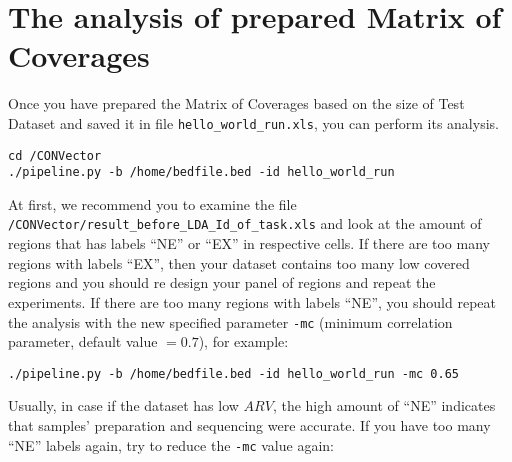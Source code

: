 \documentclass{article}
\begin{document}
\begin{usecase}
\end{usecase}






\newpage

\section{The analysis of prepared Matrix of Coverages}

Once you have prepared the Matrix of Coverages based on the size of Test Dataset and saved it in file \texttt{hello\_world\_run.xls}, you can perform its analysis.

\begin{lstlisting}[style=DOS, caption={Run of the package using prepared Matrix of Coverages}]
cd /CONVector
./pipeline.py -b /home/bedfile.bed -id hello_world_run
\end{lstlisting}

At first, we recommend you to examine the file \texttt{/CONVector/result\_before\_LDA\_Id\_of\_task.xls} and look at the amount of regions that has labels ``NE'' or ``EX'' in respective cells. If there are too many regions with labels ``EX'', then your dataset contains too many low covered regions and you should re design your panel of regions and repeat the experiments. If there are too many regions with labels ``NE'', you should repeat the analysis with the new specified parameter \texttt{-mc} (minimum correlation parameter, default value $= 0.7$), for example:

\begin{lstlisting}[style=DOS, caption={Run of the package using prepared Matrix of Coverages}]
./pipeline.py -b /home/bedfile.bed -id hello_world_run -mc 0.65
\end{lstlisting}

Usually, in case if the dataset has low $ARV$, the high amount of ``NE'' indicates that samples' preparation and sequencing were accurate. If you have too many ``NE'' labels again, try to reduce the \texttt{-mc} value again:
\end{document}

